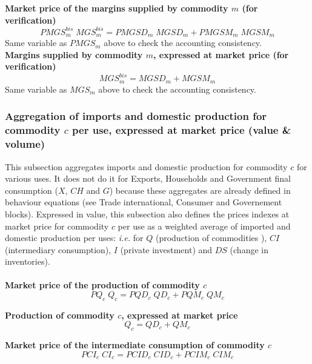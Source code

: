 \documentclass[12pt]{article}
\numberwithin{equation}{section}
\begin{document}
\noindent \textbf{Market price of the margins supplied by commodity $m$ (for verification)} 
\begin{dmath}
PMGS^{bis}_{m} \; MGS^{bis}_{m} = PMGSD_{m} \; MGSD_{m} + PMGSM_{m} \; MGSM_{m}
\label{SU.mdlPMGSbis[m]}
\end{dmath}
Same variable as $PMGS_{m}$ above to check the accounting consistency. \\

\noindent \textbf{Margins supplied by commodity $m$, expressed at market price (for verification)} 
\begin{dmath}
MGS^{bis}_{m} = MGSD_{m} + MGSM_{m}
\label{SU.mdlMGSbis[m]}
\end{dmath}
Same variable as $MGS_{m}$ above to check the accounting consistency. \\



\subsubsection{Aggregation of imports and domestic production for commodity $c$ per use, expressed at market price (value \& volume)}


This subsection aggregates imports and domestic production for commodity $c$ for various uses. It does not do it for Exports, Households and Government final consumption ($X$, $CH$ and $G$) because these aggregates are already defined in behaviour equations (see Trade international, Consumer and Governement blocks). Expressed in value, this subsection also defines the prices indexes at market price for commodity $c$ per use as a weighted average of imported and domestic production per uses: \textit{i.e.} for $Q$ (production of commodities ), $CI$ (intermediary consumption), $I$ (private investment) and $DS$ (change in inventories). \\
 \\

\noindent \textbf{Market price of the production of commodity $c$} 
\begin{dmath}
PQ_{c} \; Q_{c} = PQD_{c} \; QD_{c} + PQM_{c} \; QM_{c}
\label{SU.mdlPQ[c]}
\end{dmath}

\noindent \textbf{Production of commodity $c$, expressed at market price} 
\begin{dmath}
Q_{c} = QD_{c} + QM_{c}
\label{SU.mdlQ[c]}
\end{dmath}

\noindent \textbf{Market price of the intermediate consumption of commodity $c$} 
\begin{dmath}
PCI_{c} \; CI_{c} = PCID_{c} \; CID_{c} + PCIM_{c} \; CIM_{c}
\label{SU.mdlPCI[c]}
\end{dmath}
\end{document}

